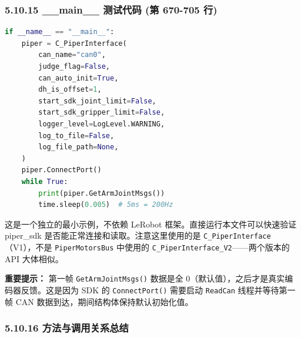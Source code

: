 \documentclass[UTF8,a4paper,11pt]{ctexart}
\begin{document}
{\subsubsection{5.10.15 __main__ 测试代码 (第 670-705 行)}

\begin{lstlisting}[language=python]
if __name__ == "__main__":
    piper = C_PiperInterface(
        can_name="can0",
        judge_flag=False,
        can_auto_init=True,
        dh_is_offset=1,
        start_sdk_joint_limit=False,
        start_sdk_gripper_limit=False,
        logger_level=LogLevel.WARNING,
        log_to_file=False,
        log_file_path=None,
    )
    piper.ConnectPort()
    while True:
        print(piper.GetArmJointMsgs())
        time.sleep(0.005)  # 5ms = 200Hz
\end{lstlisting}

这是一个独立的最小示例，不依赖 LeRobot 框架。直接运行本文件可以快速验证 piper_sdk 是否能正常连接和读取。注意这里使用的是 \texttt{C_PiperInterface}（V1），不是 \texttt{PiperMotorsBus} 中使用的 \texttt{C_PiperInterface_V2}——两个版本的 API 大体相似。

\textbf{重要提示：} 第一帧 \texttt{GetArmJointMsgs()} 数据是全 0（默认值），之后才是真实编码器反馈。这是因为 SDK 的 \texttt{ConnectPort()} 需要启动 \texttt{ReadCan} 线程并等待第一帧 CAN 数据到达，期间结构体保持默认初始化值。

\subsubsection{5.10.16 方法与调用关系总结}

}
\end{document}
